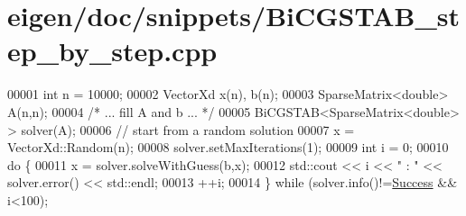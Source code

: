 \hypertarget{eigen_2doc_2snippets_2_bi_c_g_s_t_a_b__step__by__step_8cpp_source}{}\section{eigen/doc/snippets/\+Bi\+C\+G\+S\+T\+A\+B\+\_\+step\+\_\+by\+\_\+step.cpp}
\label{eigen_2doc_2snippets_2_bi_c_g_s_t_a_b__step__by__step_8cpp_source}

\begin{DoxyCode}
00001   \textcolor{keywordtype}{int} n = 10000;
00002   VectorXd x(n), b(n);
00003   SparseMatrix<double> A(n,n);
00004   \textcolor{comment}{/* ... fill A and b ... */} 
00005   BiCGSTAB<SparseMatrix<double> > solver(A);
00006   \textcolor{comment}{// start from a random solution}
00007   x = VectorXd::Random(n);
00008   solver.setMaxIterations(1);
00009   \textcolor{keywordtype}{int} i = 0;
00010   \textcolor{keywordflow}{do} \{
00011     x = solver.solveWithGuess(b,x);
00012     std::cout << i << \textcolor{stringliteral}{" : "} << solver.error() << std::endl;
00013     ++i;
00014   \} \textcolor{keywordflow}{while} (solver.info()!=\hyperlink{group__enums_gga85fad7b87587764e5cf6b513a9e0ee5ea52581b035f4b59c203b8ff999ef5fcea}{Success} && i<100);
\end{DoxyCode}
